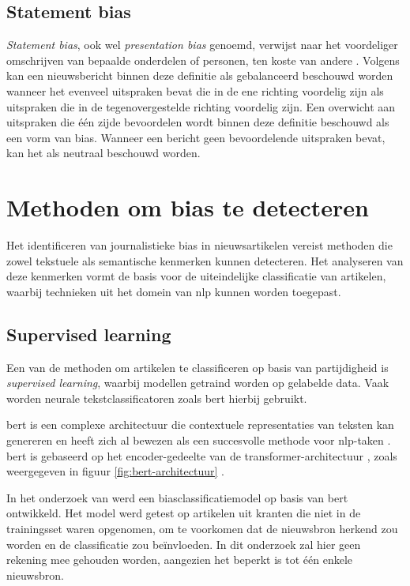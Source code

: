 \subsection{Statement bias}

\textit{Statement bias}, ook wel \textit{presentation bias} genoemd, verwijst naar het voordeliger omschrijven van bepaalde onderdelen of personen, ten koste van andere \autocite{SaezTrumper2013}. Volgens \textcite{DAlessio2006} kan een nieuwsbericht binnen deze definitie als gebalanceerd beschouwd worden wanneer het evenveel uitspraken bevat die in de ene richting voordelig zijn als uitspraken die in de tegenovergestelde richting voordelig zijn. Een overwicht aan uitspraken die één zijde bevoordelen wordt binnen deze definitie beschouwd als een vorm van bias. Wanneer een bericht geen bevoordelende uitspraken bevat, kan het als neutraal beschouwd worden.

\section{Methoden om bias te detecteren}
\label{sec:methoden-om-bias-te-detecteren}

Het identificeren van journalistieke bias in nieuwsartikelen vereist methoden die zowel tekstuele als semantische kenmerken kunnen detecteren. Het analyseren van deze kenmerken vormt de basis voor de uiteindelijke classificatie van artikelen, waarbij technieken uit het domein van \gls{nlp} kunnen worden toegepast.

\subsection{Supervised learning}

Een van de methoden om artikelen te classificeren op basis van partijdigheid is \textit{supervised learning}, waarbij modellen getraind worden op gelabelde data. Vaak worden neurale tekstclassificatoren zoals \gls{bert} hierbij gebruikt.

\gls{bert} is een complexe architectuur die contextuele representaties van teksten kan genereren en heeft zich al bewezen als een succesvolle methode voor \gls{nlp}-taken \autocite{Baly2020}. \gls{bert} is gebaseerd op het encoder-gedeelte van de transformer-architectuur \autocite{Devlin2018}, zoals weergegeven in figuur \ref{fig:bert-architectuur} \autocite{Vaswani2017}.

In het onderzoek van \textcite{Baly2020} werd een biasclassificatiemodel op basis van \gls{bert} ontwikkeld. Het model werd getest op artikelen uit kranten die niet in de trainingsset waren opgenomen, om te voorkomen dat de nieuwsbron herkend zou worden en de classificatie zou beïnvloeden. In dit onderzoek zal hier geen rekening mee gehouden worden, aangezien het beperkt is tot één enkele nieuwsbron.

